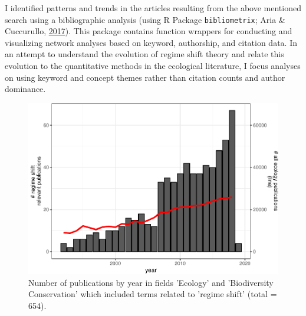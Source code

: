\documentclass[12pt,twoside,openany]{reedthesis}
\begin{document}
I identified patterns and trends in the articles resulting from the above mentioned search using a bibliographic analysis (using R Package \texttt{bibliometrix}; Aria \& Cuccurullo, \protect\hyperlink{ref-bibliometrix}{2017}). This package contains function wrappers for conducting and visualizing network analyses based on keyword, authorship, and citation data. In an attempt to understand the evolution of regime shift theory and relate this evolution to the quantitative methods in the ecological literature, I focus analyses on using keyword and concept themes rather than citation counts and author dominance.
\begin{figure}[bth]

{\centering \includegraphics[width=0.85\linewidth]{_myDissertation_files/figure-latex/wosRegimePubsByYearwithNumEcolPubs-1} 

}

\caption{Number of publications by year in fields 'Ecology' and 'Biodiversity Conservation' which included terms related to 'regime shift' (total = 654).}\label{fig:wosRegimePubsByYearwithNumEcolPubs}
\end{figure}
\end{document}

